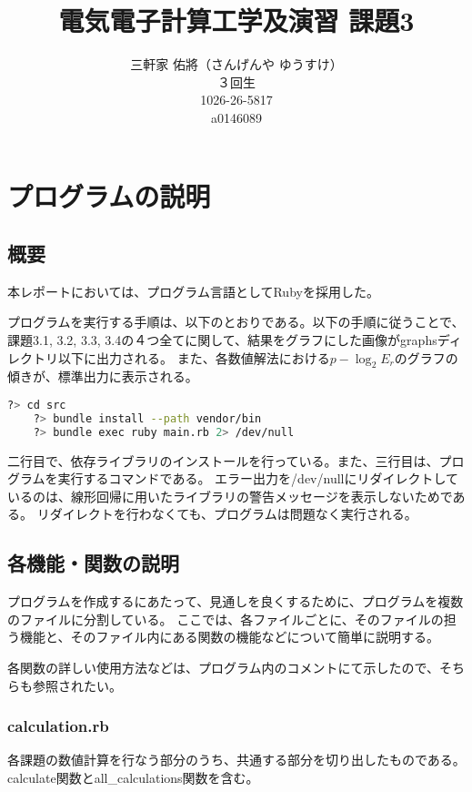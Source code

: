 \documentclass[11pt]{jsarticle}
\title{電気電子計算工学及演習 課題3}
\author{三軒家 佑將（さんげんや ゆうすけ） \\ ３回生 \\ 1026-26-5817 \\ a0146089}
\date{}
\begin{document}
    \maketitle
    
    \section{プログラムの説明}
        \subsection{概要}
            本レポートにおいては、プログラム言語としてRubyを採用した。

            プログラムを実行する手順は、以下のとおりである。以下の手順に従うことで、課題3.1, 3.2, 3.3, 3.4の４つ全てに関して、結果をグラフにした画像がgraphsディレクトリ以下に出力される。
            また、各数値解法における$p - \log_2 E_r$のグラフの傾きが、標準出力に表示される。
            \begin{lstlisting}[language=bash]
    ?> cd src
    ?> bundle install --path vendor/bin
    ?> bundle exec ruby main.rb 2> /dev/null
            \end{lstlisting}
            二行目で、依存ライブラリのインストールを行っている。また、三行目は、プログラムを実行するコマンドである。
            エラー出力を/dev/nullにリダイレクトしているのは、線形回帰に用いたライブラリの警告メッセージを表示しないためである。
            リダイレクトを行わなくても、プログラムは問題なく実行される。

        \subsection{各機能・関数の説明}
            プログラムを作成するにあたって、見通しを良くするために、プログラムを複数のファイルに分割している。
            ここでは、各ファイルごとに、そのファイルの担う機能と、そのファイル内にある関数の機能などについて簡単に説明する。

            各関数の詳しい使用方法などは、プログラム内のコメントにて示したので、そちらも参照されたい。

            \subsubsection*{calculation.rb}
                各課題の数値計算を行なう部分のうち、共通する部分を切り出したものである。calculate関数とall\_calculations関数を含む。
\end{document}
